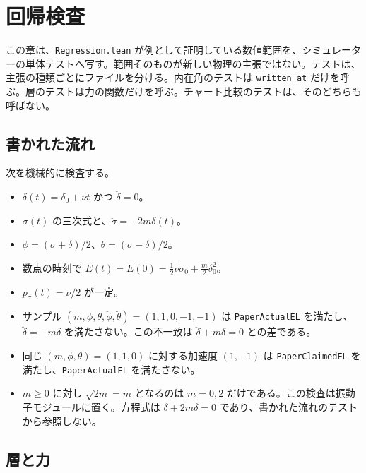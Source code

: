 \section{回帰検査}
\label{sec:checks}

この章は、\texttt{Regression.lean} が例として証明している数値範囲を、シミュレーターの単体テストへ写す。範囲そのものが新しい物理の主張ではない。テストは、主張の種類ごとにファイルを分ける。内在角のテストは \texttt{written\_at} だけを呼ぶ。層のテストは力の関数だけを呼ぶ。チャート比較のテストは、そのどちらも呼ばない。

\subsection{書かれた流れ}

次を機械的に検査する。

\begin{itemize}
\item \(\delta(t)=\delta_0+\nu t\) かつ \(\ddot\delta=0\)。
\item \(\sigma(t)\) の三次式と、\(\ddot\sigma=-2m\delta(t)\)。
\item \(\phi=(\sigma+\delta)/2\)、\(\theta=(\sigma-\delta)/2\)。
\item 数点の時刻で \(E(t)=E(0)=\frac12\nu\dot\sigma_0+\frac m2\delta_0^2\)。
\item \(p_\sigma(t)=\nu/2\) が一定。
\item サンプル \((m,\phi,\theta,\ddot\phi,\ddot\theta)=(1,1,0,-1,-1)\) は \texttt{PaperActualEL} を満たし、\(\ddot\delta=-m\delta\) を満たさない。この不一致は \(\ddot\delta+m\delta=0\) との差である。
\item 同じ \((m,\phi,\theta)=(1,1,0)\) に対する加速度 \((1,-1)\) は \texttt{PaperClaimedEL} を満たし、\texttt{PaperActualEL} を満たさない。
\item \(m\ge 0\) に対し \(\sqrt{2m}=m\) となるのは \(m=0,2\) だけである。この検査は振動子モジュールに置く。方程式は \(\ddot\delta+2m\delta=0\) であり、書かれた流れのテストから参照しない。
\end{itemize}

\subsection{層と力}

